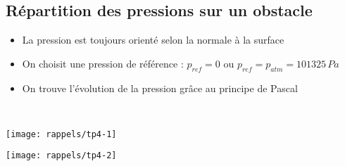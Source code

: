 \subsection*{Répartition des pressions sur un obstacle}
\begin{itemize}
	\item La pression est toujours orienté selon la normale à la surface
	\item On choisit une pression de référence : $p_{ref} = 0$ ou $p_{ref} = p_{atm} = 101325 \, Pa$
	\item On trouve l'évolution de la pression grâce au principe de Pascal
\end{itemize}
\ \\
\begin{minipage}{0.55 \textwidth}
	\begin{flushleft}
		\texttt{[image: rappels/tp4-1]}
	\end{flushleft}
\end{minipage}
\begin{minipage}{0.5 \textwidth}
	\begin{flushleft}
		\texttt{[image: rappels/tp4-2]}
	\end{flushleft}
\end{minipage}
